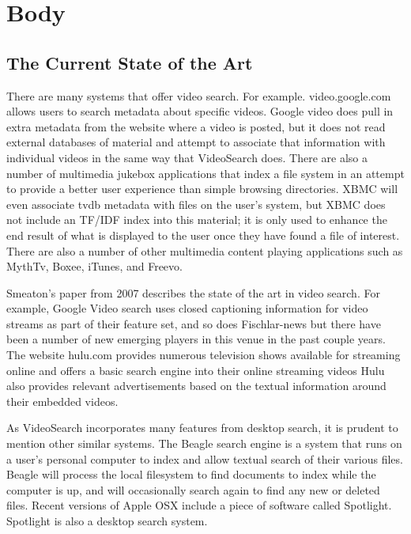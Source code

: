 \documentclass{acm_proc_article-sp}
\begin{document}
\section{Body}
\subsection{The Current State of the Art}

    There are many systems that offer video search.  For example. video.google.com allows users to search metadata about specific videos.  Google video does pull in extra metadata from the website where a video is posted, but it does not read external databases of material and attempt to associate that information with individual videos in the same way that VideoSearch does.  There are also a number of multimedia jukebox applications that index a file system in an attempt to provide a better user experience than simple browsing directories. XBMC will even associate tvdb metadata with files on the user\textquoteright s system\cite{goodwin2010appliance}, but XBMC does not include an TF/IDF index into this material; it is only used to enhance the end result of what is displayed to the user once they have found a file of interest. There are also a number of other multimedia content playing applications such as MythTv, Boxee, iTunes, and Freevo.\cite{schopman2010notube}

    Smeaton\textquoteright s paper from 2007 describes the state of the art in video search. \cite{smeaton2007techniques} For example, Google Video search uses closed captioning information for video streams as part of their feature set, and so does Fischlar-news \cite{lee2006user} but there have been a number of new emerging players in this venue in the past couple years.  The website hulu.com provides numerous television shows available for streaming online and offers a basic search engine into their online streaming videos \cite{patent:20100287474} Hulu also provides relevant advertisements based on the textual information around their embedded videos.

    As VideoSearch incorporates many features from desktop search, it is prudent to mention other similar systems.  The Beagle search engine is a system that runs on a user\textquoteright s personal computer to index and allow textual search of their various files.  \cite{brunkhorst2006beagle++}  Beagle will process the local filesystem to find documents to index while the computer is up, and will occasionally search again to find any new or deleted files.  Recent versions of Apple OSX include a piece of software called Spotlight.\cite{applex} Spotlight is also a desktop search system.
\end{document}
